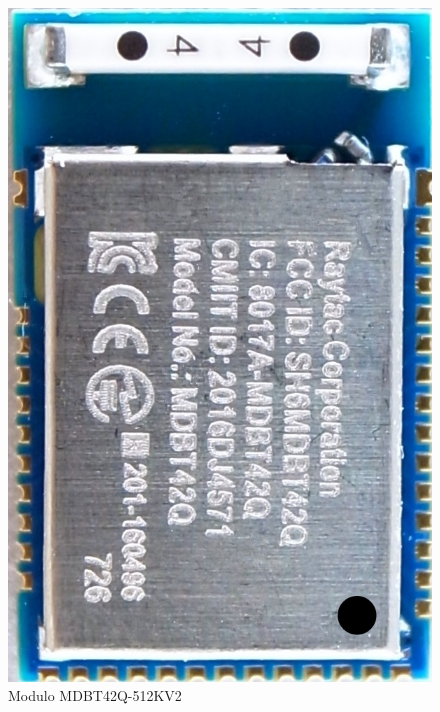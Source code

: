 \begin{figure}[htpb]
	\centering
	\includegraphics[scale=0.15]{./Figures/MDBT42Q.jpg}
	\caption{Modulo MDBT42Q-512KV2}
	\label{fig:MDBT42}
\end{figure}

